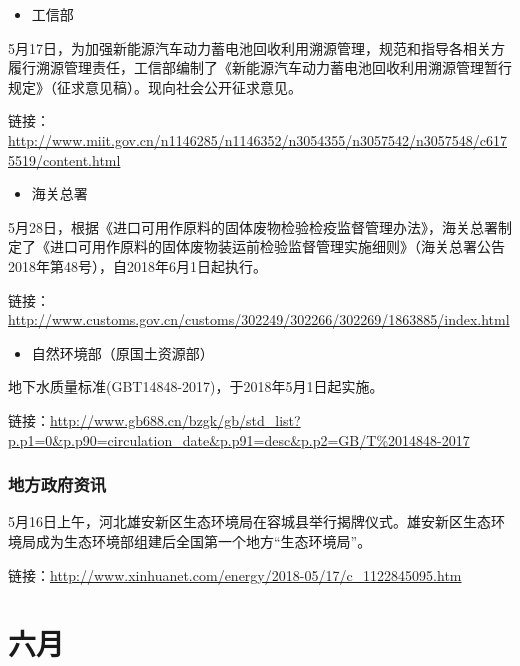 \documentclass[]{book}
\providecommand{\tightlist}{%
  \setlength{\itemsep}{0pt}\setlength{\parskip}{0pt}}
\begin{document}
\begin{itemize}
\tightlist
\item
  工信部
\end{itemize}

5月17日，为加强新能源汽车动力蓄电池回收利用溯源管理，规范和指导各相关方履行溯源管理责任，工信部编制了《新能源汽车动力蓄电池回收利用溯源管理暂行规定》（征求意见稿）。现向社会公开征求意见。

链接：\url{http://www.miit.gov.cn/n1146285/n1146352/n3054355/n3057542/n3057548/c6175519/content.html}

\begin{itemize}
\tightlist
\item
  海关总署
\end{itemize}

5月28日，根据《进口可用作原料的固体废物检验检疫监督管理办法》，海关总署制定了《进口可用作原料的固体废物装运前检验监督管理实施细则》（海关总署公告2018年第48号），自2018年6月1日起执行。

链接：\url{http://www.customs.gov.cn/customs/302249/302266/302269/1863885/index.html}

\begin{itemize}
\tightlist
\item
  自然环境部（原国土资源部）
\end{itemize}

地下水质量标准(GBT14848-2017)，于2018年5月1日起实施。

链接：\url{http://www.gb688.cn/bzgk/gb/std_list?p.p1=0\&p.p90=circulation_date\&p.p91=desc\&p.p2=GB/T\%2014848-2017}

\hypertarget{ux5730ux65b9ux653fux5e9cux8d44ux8baf}{%
\subsubsection*{地方政府资讯}\label{ux5730ux65b9ux653fux5e9cux8d44ux8baf}}

5月16日上午，河北雄安新区生态环境局在容城县举行揭牌仪式。雄安新区生态环境局成为生态环境部组建后全国第一个地方``生态环境局''。

链接：\url{http://www.xinhuanet.com/energy/2018-05/17/c_1122845095.htm}

\hypertarget{ux516dux6708}{%
\section*{六月}\label{ux516dux6708}}
\end{document}
